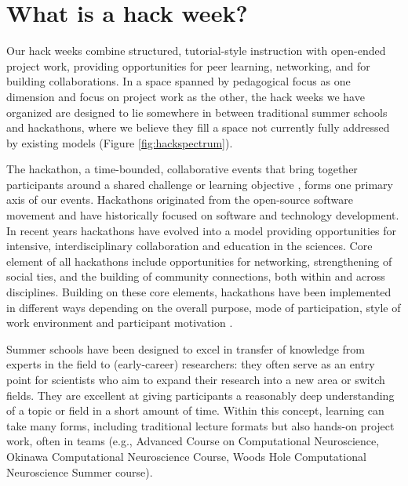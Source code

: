 \section*{What is a hack week?}

Our hack weeks combine structured, tutorial-style instruction with open-ended project work, providing opportunities for peer learning, networking, and for building collaborations.
In a space spanned by pedagogical focus as one dimension and focus on project work as the other, the hack weeks we have organized are designed to lie somewhere in between traditional summer schools and hackathons, where we believe they fill a space not currently fully addressed by existing models (Figure \ref{fig:hackspectrum}).

The hackathon, a time-bounded, collaborative events that bring together participants around a shared challenge or learning objective \cite{Decker2015}, forms one primary axis of our events.
Hackathons originated from the open-source software movement and have historically focused on software and technology development.
In recent years hackathons have evolved into a model providing opportunities for intensive, interdisciplinary collaboration \cite{Groen2015-cj} and education \cite{Kienzler2015-zu,Lamers2014-xf} in the sciences.
Core element of all hackathons include opportunities for networking, strengthening of social ties, and the building of community connections, both within and across disciplines.
Building on these core elements, hackathons have been implemented in different ways depending on the overall purpose, mode of participation, style of work environment and participant motivation \cite{Drouhard2017}.

Summer schools have been designed to excel in transfer of knowledge from experts in the field to (early-career) researchers: they often serve as an entry point for scientists who aim to expand their research into a new area or switch fields. They are excellent at giving participants a reasonably deep understanding of a topic or field in a short amount of time. Within this concept, learning can take many forms, including traditional lecture formats but also hands-on project work, often in teams (e.g., Advanced Course on Computational Neuroscience, Okinawa Computational Neuroscience Course, Woods Hole Computational Neuroscience Summer course).

